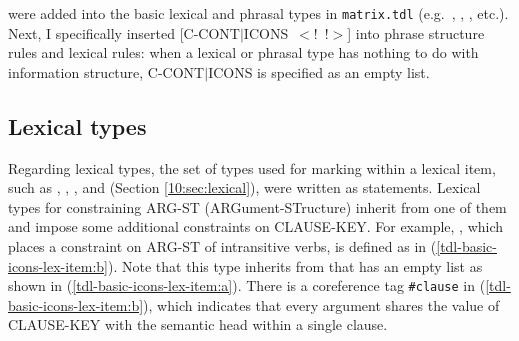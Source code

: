 \noindent {} were added into the basic lexical and phrasal
types in \texttt{matrix.tdl} (e.g.\ ,
, , etc.). Next, I specifically
inserted \mbox{[C-CONT{$\mid$}ICONS \ensuremath{<}!  !\ensuremath{>}]}
into phrase structure rules and lexical rules: when a lexical or
phrasal type has nothing to do with information structure,
C-CONT{$\mid$}ICONS is specified as an empty list.




\subsection{Lexical types}
\label{11:ssec:lt}



Regarding lexical types, the set of types used for marking 
within a lexical item, such as ,
, , and
 (Section \ref{10:sec:lexical}), were written as
 statements. Lexical types for constraining ARG-ST
(ARGument-STructure) inherit from one of them and impose some
additional constraints on CLAUSE-KEY.  For example,
, which places a constraint on ARG-ST of
intransitive verbs, is defined as in
(\ref{tdl-basic-icons-lex-item:b}). Note that this type inherits from
 that has an empty  list as shown
in (\ref{tdl-basic-icons-lex-item:a}).  There is a coreference tag
\texttt{\#clause} in (\ref{tdl-basic-icons-lex-item:b}), which
indicates that every argument shares the value of CLAUSE-KEY with the
semantic head within a single clause.







